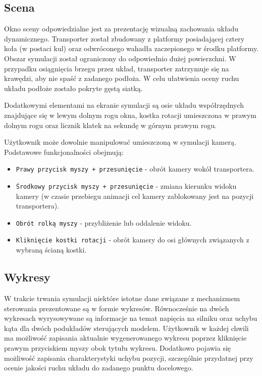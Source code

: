 \documentclass[12pt, twoside, openany]{report}
\theoremstyle{definition}
\begin{document}
\subsection{Scena}
Okno sceny odpowiedzialne jest za prezentację wizualną zachowania układu dynamicznego. Transporter został zbudowany z platformy posiadającej cztery koła (w postaci kul) oraz odwróconego wahadła zaczepionego w środku platformy. Obszar symulacji został ograniczony do odpowiednio dużej powierzchni. W przypadku osiągnięcia brzegu przez układ, transporter zatrzymuje się na krawędzi, aby nie spaść z zadanego podłoża. W celu ułatwienia oceny ruchu układu podłoże zostało pokryte gęstą siatką.

Dodatkowymi elementami na ekranie symulacji są osie układu współrzędnych znajdujące się w lewym dolnym rogu okna, kostka rotacji umieszczona w prawym dolnym rogu oraz licznik klatek na sekundę w górnym prawym rogu.

Użytkownik może dowolnie manipulować umieszczoną w symulacji kamerą. Podstawowe funkcjonalności obejmują:
\begin{itemize}
\item \texttt{Prawy przycisk myszy + przesunięcie} - obrót kamery wokół transportera.
\item \texttt{Środkowy przycisk myszy + przesunięcie} - zmiana kierunku widoku kamery (w czasie przebiegu animacji cel kamery zablokowany jest na pozycji transportera).
\item \texttt{Obrót rolką myszy} - przybliżenie lub oddalenie widoku.
\item \texttt{Kliknięcie kostki rotacji} - obrót kamery do osi głównych związanych z wybraną ścianą kostki.
\end{itemize}

\subsection{Wykresy}
W trakcie trwania symulacji niektóre istotne dane związane z mechanizmem sterowania prezentowane są w formie wykresów. Równocześnie na dwóch wykresach wyrysowywane są informacje na temat napięcia na silniku oraz uchybu kąta dla dwóch podukładów sterujących modelem. Użytkownik w każdej chwili ma możliwość zapisania aktualnie wygenerowanego wykresu poprzez kliknięcie prawym przyciskiem myszy obok tytułu wykresu. Dodatkowo pojawia się możliwość zapisania charakterystyki uchybu pozycji, szczególnie przydatnej przy ocenie jakości ruchu układu do zadanego punktu docelowego.
\end{document}
